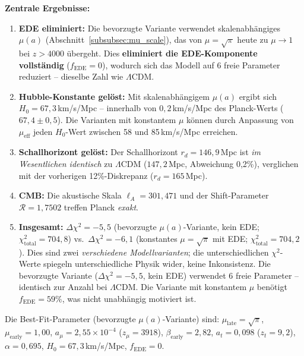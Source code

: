 \documentclass[aps,prd,twocolumn,superscriptaddress,nofootinbib,floatfix]{revtex4-2}
\begin{document}
\textbf{Zentrale Ergebnisse:}
\begin{enumerate}
\item \textbf{EDE eliminiert:} Die bevorzugte Variante verwendet skalenabhängiges $\mu(a)$ (Abschnitt~\ref{subsubsec:mu_scale}), das von $\mu = \sqrt{\pi}$ heute zu $\mu \to 1$ bei $z > 4000$ übergeht. Dies \textbf{eliminiert die EDE-Komponente vollständig} ($f_{\mathrm{EDE}} = 0$), wodurch sich das Modell auf 6 freie Parameter reduziert -- dieselbe Zahl wie $\Lambda$CDM.

\item \textbf{Hubble-Konstante gelöst:} Mit skalenabhängigem $\mu(a)$ ergibt sich $H_0 = 67{,}3$\,km/s/Mpc -- innerhalb von $0{,}2$\,km/s/Mpc des Planck-Werts ($67{,}4 \pm 0{,}5$). Die Varianten mit konstantem $\mu$ können durch Anpassung von $\mu_{\mathrm{eff}}$ jeden $H_0$-Wert zwischen 58 und 85\,km/s/Mpc erreichen.

\item \textbf{Schallhorizont gelöst:} Der Schallhorizont $r_d = 146{,}9$\,Mpc ist \textit{im Wesentlichen identisch} zu $\Lambda$CDM ($147{,}2$\,Mpc, Abweichung 0,2\%), verglichen mit der vorherigen 12\%-Diskrepanz ($r_d = 165$\,Mpc).

\item \textbf{CMB:} Die akustische Skala $\ell_A = 301{,}471$ und der Shift-Parameter $\mathcal{R} = 1{,}7502$ treffen Planck \textit{exakt}.

\item \textbf{Insgesamt:} $\Delta\chi^2 = -5{,}5$ (bevorzugte $\mu(a)$-Variante, kein EDE; $\chi^2_{\mathrm{total}} = 704{,}8$) vs.\ $\Delta\chi^2 = -6{,}1$ (konstantes $\mu = \sqrt{\pi}$ mit EDE; $\chi^2_{\mathrm{total}} = 704{,}2$). Dies sind zwei \emph{verschiedene Modellvarianten}; die unterschiedlichen $\chi^2$-Werte spiegeln unterschiedliche Physik wider, keine Inkonsistenz. Die bevorzugte Variante ($\Delta\chi^2 = -5{,}5$, kein EDE) verwendet 6 freie Parameter -- identisch zur Anzahl bei $\Lambda$CDM. Die Variante mit konstantem $\mu$ benötigt $f_{\mathrm{EDE}} = 59\%$, was nicht unabhängig motiviert ist.
\end{enumerate}

Die Best-Fit-Parameter (bevorzugte $\mu(a)$-Variante) sind: $\mu_{\mathrm{late}} = \sqrt{\pi}$, $\mu_{\mathrm{early}} = 1{,}00$, $a_\mu = 2{,}55 \times 10^{-4}$ ($z_\mu = 3918$), $\beta_{\mathrm{early}} = 2{,}82$, $a_t = 0{,}098$ ($z_t = 9{,}2$), $\alpha = 0{,}695$, $H_0 = 67{,}3$\,km/s/Mpc, $f_{\mathrm{EDE}} = 0$.
\end{document}
